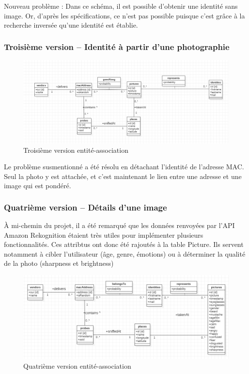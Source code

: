 Nouveau problème : Dans ce schéma, il est possible d’obtenir une identité sans image. Or, d’après les
spécifications, ce n’est pas possible puisque c’est grâce à la recherche inversée qu’une identité est établie.

\subsubsection{Troisième version – Identité à partir d’une photographie}

\begin{figure}[H]
	\centering
	\includegraphics[width=12cm]{images/proto-3.png}
	\caption{Troisième version entité-association}
	\label{fig:model-ea-3}
\end{figure}

Le problème susmentionné a été résolu en détachant l’identité de l’adresse MAC. Seul la photo y est attachée, et
c’est maintenant le lien entre une adresse et une image qui est pondéré.

\subsubsection{Quatrième version – Détails d'une image}

À mi-chemin du projet, il a été remarqué que les données renvoyées par l'API Amazon Rekognition étaient très utiles 
pour implémenter plusieurs fonctionnalités. Ces attribtus ont donc été rajoutés à la table Picture.
Ils servent notamment à cibler l'utilisateur (âge, genre, émotions) ou à déterminer la qualité de la photo (sharpness et brightness)

\begin{figure}[H]
	\centering
	\includegraphics[width=12cm]{images/database_4.png}
	\caption{Quatrième version entité-association}
	\label{fig:model-ea-4}
\end{figure}

